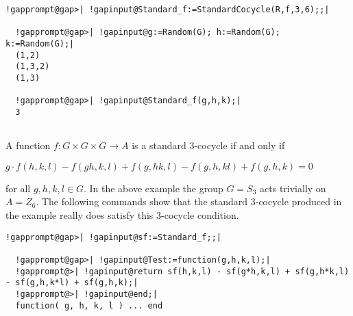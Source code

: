 \documentclass[a4paper,11pt]{report}
\begin{document}
{{\begin{Verbatim}[commandchars=!@|,fontsize=\small,frame=single,label=Example]
  !gapprompt@gap>| !gapinput@Standard_f:=StandardCocycle(R,f,3,6);;|
  
  !gapprompt@gap>| !gapinput@g:=Random(G); h:=Random(G); k:=Random(G);|
  (1,2)
  (1,3,2)
  (1,3)
  
  !gapprompt@gap>| !gapinput@Standard_f(g,h,k);|
  3
  
\end{Verbatim}
 A function $f\colon G\times G\times G \rightarrow A$ is a standard $3$-cocycle if and only if 

$g\cdot f(h,k,l) - f(gh,k,l) + f(g,hk,l) - f(g,h,kl) + f(g,h,k) = 0$ 

for all $g,h,k,l \in G$. In the above example the group $G=S_3$ acts trivially on $A=Z_6$. The following commands show that the standard $3$-cocycle produced in the example really does satisfy this $3$-cocycle condition. 
\begin{Verbatim}[commandchars=!@|,fontsize=\small,frame=single,label=Example]
  !gapprompt@gap>| !gapinput@sf:=Standard_f;;|
  
  !gapprompt@gap>| !gapinput@Test:=function(g,h,k,l);|
  !gapprompt@>| !gapinput@return sf(h,k,l) - sf(g*h,k,l) + sf(g,h*k,l) - sf(g,h,k*l) + sf(g,h,k);|
  !gapprompt@>| !gapinput@end;|
  function( g, h, k, l ) ... end
  

\end{Verbatim}}}
\end{document}
